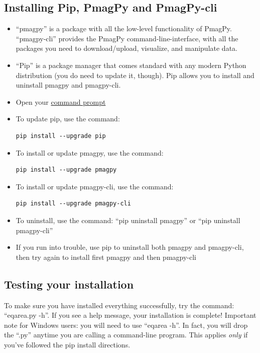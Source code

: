 \documentclass[11pt]{book}
\begin{document}
{   \subsection{Installing Pip, PmagPy and PmagPy-cli}
   \begin{itemize}
     \item ``pmagpy'' is a package with all the low-level functionality of PmagPy.  ``pmagpy-cli'' provides the PmagPy command-line-interface, with all the packages you need to download/upload, visualize, and manipulate data.  
     \item ``Pip'' is a package manager that comes standard with any modern Python distribution (you do need to update it, though).  Pip allows you to install and uninstall pmagpy and pmagpy-cli.
     \item Open your \href{#command_line}{command prompt}
     \item To update pip, use the command: \begin{verbatim}pip install --upgrade pip\end{verbatim}
     \item To install or update pmagpy, use the command: \begin{verbatim}pip install --upgrade pmagpy \end{verbatim}
     \item To install or update pmagpy-cli, use the command: \begin{verbatim}pip install --upgrade pmagpy-cli \end{verbatim}
     \item To uninstall, use the command: ``pip uninstall pmagpy'' or ``pip uninstall pmagpy-cli''
     \item If you run into trouble, use pip to uninstall both pmagpy and pmagpy-cli, then try again to install first pmagpy and then pmagpy-cli
   \end{itemize}
   \subsection{Testing your installation}
   To make sure you have installed everything successfully, try the command: ``eqarea.py -h''.  If you see a help message, your installation is complete!
   Important note for Windows users: you will need to use ``eqarea -h''.  In fact, you will drop the ``.py'' anytime you are calling a command-line program.  This applies \textit{only} if you've followed the pip install directions.
}
\end{document}
